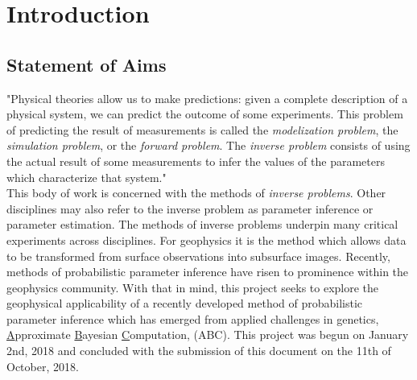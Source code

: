 
\chapter{Introduction}

\section{Statement of Aims}

"Physical theories allow us to make predictions: given a complete description of a physical system, we can predict the outcome of some experiments. This problem of predicting the result of measurements is called the \textit{modelization problem}, the \textit{simulation problem}, or the \textit{forward problem}. The \textit{inverse problem} consists of using the actual result of some measurements to infer the values of the parameters which characterize that system." \citep{Tarantola2005}\\

This body of work is concerned with the methods of \textit{inverse problems}. Other disciplines may also refer to the inverse problem as parameter inference or parameter estimation. The methods of inverse problems underpin many critical experiments across disciplines. For geophysics it is the method which allows data to be transformed from surface observations into subsurface images. Recently, methods of probabilistic parameter inference have risen to prominence within the geophysics community. With that in mind, this project seeks to explore the geophysical applicability of a recently developed method of probabilistic parameter inference which has emerged from applied challenges in genetics, \underline{A}pproximate \underline{B}ayesian \underline{C}omputation, (ABC). This project was begun on January 2nd, 2018 and concluded with the submission of this document on the 11th of October, 2018.

